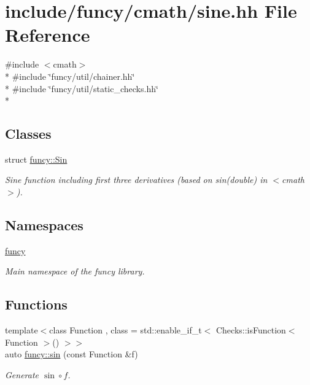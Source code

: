 \hypertarget{sine_8hh}{\section{include/funcy/cmath/sine.hh File Reference}
\label{sine_8hh}
}
{\ttfamily \#include $<$cmath$>$}\\*
{\ttfamily \#include \char`\"{}funcy/util/chainer.\-hh\char`\"{}}\\*
{\ttfamily \#include \char`\"{}funcy/util/static\-\_\-checks.\-hh\char`\"{}}\\*
\subsection*{Classes}
\begin{DoxyCompactItemize}
\item 
struct \hyperlink{structfuncy_1_1Sin}{funcy\-::\-Sin}
\begin{DoxyCompactList}\small\item\em Sine function including first three derivatives (based on sin(double) in $<$cmath$>$). \end{DoxyCompactList}\end{DoxyCompactItemize}
\subsection*{Namespaces}
\begin{DoxyCompactItemize}
\item 
\hyperlink{namespacefuncy}{funcy}
\begin{DoxyCompactList}\small\item\em Main namespace of the funcy library. \end{DoxyCompactList}\end{DoxyCompactItemize}
\subsection*{Functions}
\begin{DoxyCompactItemize}
\item 
{\footnotesize template$<$class Function , class  = std\-::enable\-\_\-if\-\_\-t$<$ Checks\-::is\-Function$<$ Function $>$() $>$$>$ }\\auto \hyperlink{group__CMathGroup_gace9a6a15d1fd5071d13272e57d096b2c}{funcy\-::sin} (const Function \&f)
\begin{DoxyCompactList}\small\item\em Generate $ \sin\circ f $. \end{DoxyCompactList}\end{DoxyCompactItemize}
